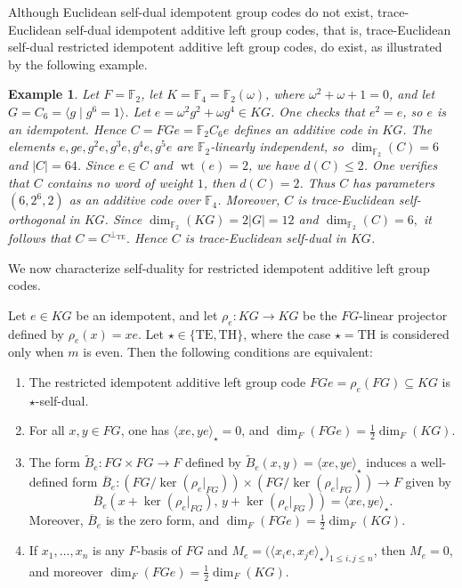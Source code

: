 \documentclass[11pt]{article}
\newtheorem{example}[theorem]{Example}
\begin{document}
Although Euclidean self-dual idempotent group codes do not exist, trace-Euclidean self-dual idempotent additive left group codes, that is, trace-Euclidean self-dual restricted idempotent additive left group codes, do exist, as illustrated by the following example.

\begin{example}

Let $F=\mathbb{F}_2$, let
$K=\mathbb{F}_4=\mathbb{F}_2(\omega)$, where
$\omega^2+\omega+1=0$, and let
$G=C_6=\langle g\mid g^6=1\rangle$. Let
$e=\omega^2g^2+\omega g^4\in KG$.
One checks that $e^2=e$, so $e$ is an idempotent. Hence
$
C=FGe=\mathbb{F}_2C_6e
$
defines an additive code in $KG$. The elements $e,ge,g^2e,g^3e,g^4e,g^5e$ are $\mathbb{F}_2$-linearly independent, so $\dim_{\mathbb{F}_2}(C)=6$ and $|C|=64$. Since $e\in C$ and $\operatorname{wt}(e)=2$, we have $d(C)\le 2$. One verifies that $C$ contains no word of weight $1$, then $d(C)=2$. Thus $C$ has parameters $(6,2^6,2)$ as an additive code over $\mathbb{F}_4$. Moreover, $C$ is trace-Euclidean self-orthogonal in $KG$. Since
$
\dim_{\mathbb{F}_2}(KG)=2|G|=12
$
and
$
\dim_{\mathbb{F}_2}(C)=6,
$
it follows that
$
C=C^{\perp_{\mathrm{TE}}}.
$
Hence $C$ is trace-Euclidean self-dual in $KG$.
\end{example}

We now characterize self-duality for restricted idempotent additive left group codes.

\begin{theorem}\label{thm:rhoe-selfdual}
Let $e\in KG$ be an idempotent, and let $\rho_e:KG\longrightarrow KG$ be the $FG$-linear projector defined by $\rho_e(x)=xe$. Let $\star\in\{\mathrm{TE},\mathrm{TH}\}$, where the case
$\star=\mathrm{TH}$ is considered only when $m$ is even. Then the following conditions are equivalent:
\begin{enumerate}
    \item The restricted idempotent additive left group code $FGe=\rho_e(FG)\subseteq KG$ is $\star$-self-dual.

    \item For all $x,y\in FG$, one has $\langle xe,ye\rangle_\star=0$, and $\dim_F(FGe)=\frac{1}{2}\dim_F(KG)$.

    \item The form $\widetilde{B}_e:FG\times FG\longrightarrow F$ defined by $\widetilde{B}_e(x,y)=\langle xe,ye\rangle_\star$ induces a well-defined form $\overline{B}_e:(FG/\ker(\rho_e|_{FG}))\times (FG/\ker(\rho_e|_{FG}))\longrightarrow F$ given by $$\overline{B}_e(x+\ker(\rho_e|_{FG}),\,y+\ker(\rho_e|_{FG}))=\langle xe,ye\rangle_\star.$$ Moreover, $\overline{B}_e$ is the zero form, and $\dim_F(FGe)=\frac{1}{2}\dim_F(KG).$

    \item If $x_1,\dots,x_n$ is any $F$-basis of $FG$ and $M_e=\bigl(\langle x_i e,x_j e\rangle_\star\bigr)_{1\le i,j\le n}$, then $M_e=0$, and moreover $\dim_F(FGe)=\frac{1}{2}\dim_F(KG)$.
\end{enumerate}
\end{theorem}
\end{document}
